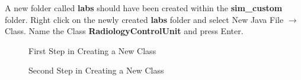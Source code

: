 \documentclass[
  10pt,
  a4paperpaper,
  DIV=11,
  numbers=noendperiod,
  oneside]{scrreprt}
\begin{document}
A new folder called \textbf{labs} should have been created within the
\textbf{sim\_custom} folder. Right click on the newly created
\textbf{labs} folder and select New Java File \(\rightarrow\) Class.
Name the Class \textbf{RadiologyControlUnit} and press Enter.

\begin{figure}[htbp]


\caption{\label{fig-create_class_1}First Step in Creating a New Class}

\end{figure}%

\begin{figure}[htbp]


\caption{\label{fig-create_class_2}Second Step in Creating a New Class}

\end{figure}%
\end{document}
